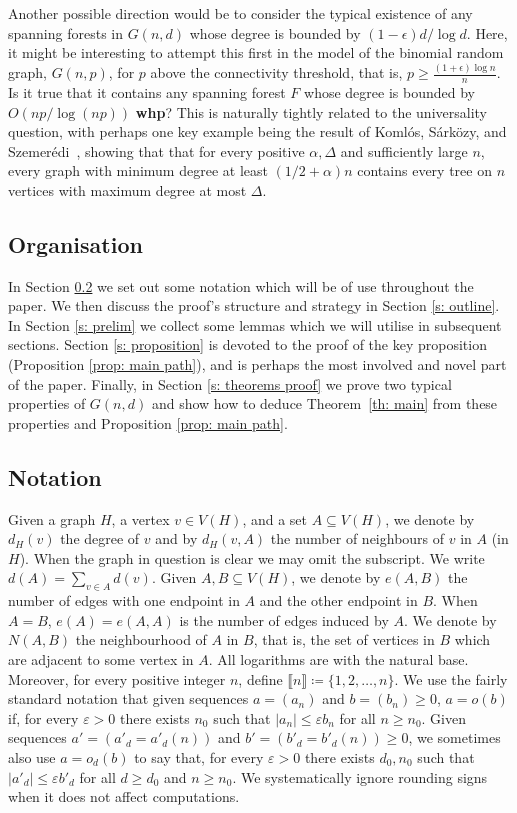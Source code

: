 \documentclass[notitlepage]{scrartcl}
\newcommand{\br}[1]{\llbracket{#1}\rrbracket}
\begin{document}
Another possible direction would be to consider the typical existence of any spanning forests in $G(n,d)$ whose degree is bounded by $(1-\epsilon)d/\log d$. Here, it might be interesting to attempt this first in the model of the binomial random graph, $G(n,p)$, for $p$ above the connectivity threshold, that is, $p\ge \frac{(1+\epsilon)\log n}{n}$. Is it true that it contains any spanning forest $F$ whose degree is bounded by $O(np/\log(np))$ \textbf{whp}? This is naturally tightly related to the universality question, with perhaps one key example being the result of Koml\'os, S\'ark\"{o}zy, and Szemer\'edi~\cite{KSS}, showing that that for every positive $\alpha,\Delta$ and sufficiently large $n$, every graph with minimum degree at least $(1/2+\alpha)n$ contains every tree on $n$ vertices with maximum degree at most $\Delta$.

\subsection{Organisation}
In Section \ref{s: notation} we set out some notation which will be of use throughout the paper. We then discuss the proof's structure and strategy in Section \ref{s: outline}.  In Section \ref{s: prelim} we collect some lemmas which we will utilise in subsequent sections. Section \ref{s: proposition} is devoted to the proof of the key proposition (Proposition \ref{prop: main path}), and is perhaps the most involved and novel part of the paper. Finally, in Section \ref{s: theorems proof} we prove two typical properties of $G(n, d)$ and show how to deduce Theorem~\ref{th: main} from these properties and Proposition \ref{prop: main path}.

\subsection{Notation}\label{s: notation}
Given a graph $H$, a vertex $v\in V(H)$, and a set $A\subseteq V(H)$, we denote by $d_H(v)$ the degree of $v$ and by $d_H(v,A)$ the number of neighbours of $v$ in $A$ (in $H$). When the graph in question is clear we may omit the subscript. We write $d(A)=\sum_{v\in A}d(v)$. Given $A,B\subseteq V(H)$, we denote by $e(A,B)$ the number of edges with one endpoint in $A$ and the other endpoint in $B$. When $A=B$, $e(A)=e(A,A)$ is the number of edges induced by $A$. We denote by $N(A,B)$ the neighbourhood of $A$ in $B$, that is, the set of vertices in $B$ which are adjacent to some vertex in $A$. All logarithms are with the natural base. Moreover, for every positive integer $n$, define $\br{n} \coloneqq \{1, 2, \dots, n\}$. We use the fairly standard notation that given sequences $a=(a_n)$ and  $b=(b_n)\geq 0$, $a=o(b)$ if, for every $\varepsilon>0$ there exists $n_0$ such that $|a_n|\leq\varepsilon b_n$ for all $n\ge n_0$. Given sequences $a'=(a'_d=a'_d(n))$ and $b'=(b'_d=b'_d(n))\geq 0$, we sometimes also use $a=o_d(b)$ to say that, for every $\varepsilon>0$ there exists $d_0,n_0$ such that $|a'_d|\leq\varepsilon b'_d$ for all $d\ge d_0$ and $n\ge n_0$. We systematically ignore rounding signs when it does not affect computations.
\end{document}
